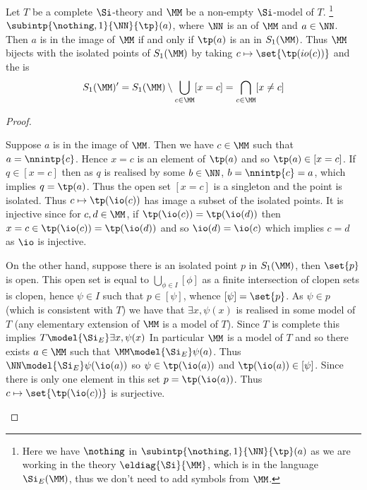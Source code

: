 \begin{lem}
    Let $T$ be a complete $\Si$-theory
    and $\MM$ be a non-empty $\Si$-model of $T$. 
    \footnote{Here we have $\nothing$ in 
            $\subintp{\nothing,1}{\NN}{\tp}(a)$ as we are working in the theory 
            $\eldiag{\Si}{\MM}$, 
            which is in the language $\Si_E(\MM)$,
            thus we don't need to add symbols from $\MM$.}
        $\subintp{\nothing,1}{\NN}{\tp}(a)$, 
    where $\NN$ is an
        of $\MM$ and $a \in \NN$.
    Then $a$ is in the image of $\MM$ if and only if 
    $\tp(a)$ is an  
    in $S_1(\MM)$.
    Thus $\MM$ bijects with the isolated points of $S_1(\MM)$
    by taking $c \mapsto \set{\tp(io(c))}$ and the 
     is
    \[  
        S_1(\MM)' = S_1(\MM) \setminus \bigcup_{c \in \MM} [x = c]
        = \bigcap_{c \in \MM} [x \ne c] 
    \]
\end{lem}
\begin{proof}
    \begin{forward}
        Suppose $a$ is in the image of $\MM$.
        Then we have $c \in \MM$ such that $a = \nnintp{c}$.
        Hence $x = c$ is an element of $\tp(a)$ and so $\tp(a) \in [x = c]$.
        If $q \in [x = c]$ then as $q$ is realised by some $b \in \NN$, 
        $b = \nnintp{c} = a$, 
        which implies $q = \tp(a)$.
        Thus the open set $[x = c]$ is a singleton and the point is isolated.
        Thus $c \mapsto \tp(\io(c))$ has image a subset of the isolated points.
        It is injective since for $c, d \in \MM$, 
        if $\tp(\io(c)) = \tp(\io(d))$ then 
        $x = c \in \tp(\io(c)) = \tp(\io(d))$
        and so $\io(d) = \io(c)$ which implies $c = d$ as $\io$ is injective.
    \end{forward}
    \begin{backward}
        On the other hand, suppose there is an isolated point $p$ in $S_1(\MM)$,
        then $\set{p}$ is open. 
        This open set is equal to $\bigcup_{\phi \in I} [\phi]$
        as a finite intersection of clopen sets is clopen,
        hence $\psi \in I$ such that $p \in [\psi]$, 
        whence $[\psi] = \set{p}$.
        As $\psi \in p$ (which is consistent with $T$) we have that 
        $\exists x, \psi(x)$ is realised in some model of $T$ 
        (any elementary extension of $\MM$ is a model of $T$). 
        Since $T$ is complete
        this implies $T \model{\Si_E} \exists x, \psi(x)$
        In particular $\MM$ is a model of $T$ and so there exists 
        $a \in \MM$ such that $\MM \model{\Si_E} \psi(a)$.
        Thus $\NN \model{\Si_E} \psi(\io(a))$ so $\psi \in \tp(\io(a))$
        and $\tp(\io(a)) \in [\psi]$.
        Since there is only one element in this set $p = \tp(\io(a))$.
        Thus $c \mapsto \set{\tp(\io(c))}$ is surjective.
    \end{backward}
\end{proof}

